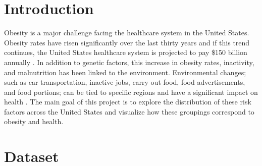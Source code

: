 \documentclass{article}
\begin{document}
 



\section{Introduction}
\label{introduction}

Obesity is a major challenge facing the healthcare system in the United States. Obesity rates have risen significantly over the last thirty years and if this trend continues, the United States healthcare system is projected to pay \$150 billion annually \cite{hurt2010obesity}.
In addition to genetic factors, this increase in obesity rates, inactivity, and malnutrition has been linked to the environment. 
Environmental changes; such as car transportation, inactive jobs, carry out food, food advertisements, and food portions; can be tied to specific regions and have a significant impact on health \cite{whyobesityhealthproblem, understandingadultoverweight}. 
The main goal of this project is to explore the distribution of these risk factors across the United States and visualize how these groupings correspond to obesity and health.

\section{Dataset}
\label{dataset}
\end{document}
